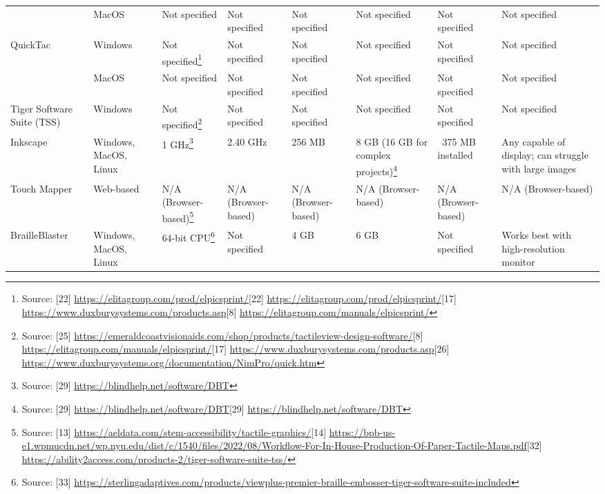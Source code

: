 \begin{longtable}{|l|l|l|l|l|l|l|l|}
 & MacOS & Not specified\footnotemark[3] & Not specified\footnotemark[3] & Not specified\footnotemark[3] & Not specified\footnotemark[3] & Not specified\footnotemark[3] & Not specified\footnotemark[3] \\
QuickTac & Windows & Not specified\footnote{Source: [22] \url{https://elitagroup.com/prod/elpicsprint/}[22] \url{https://elitagroup.com/prod/elpicsprint/}[17] \url{https://www.duxburysystems.com/products.asp}[8] \url{https://elitagroup.com/manuals/elpicsprint/}} & Not specified\footnotemark[4] & Not specified\footnotemark[4] & Not specified\footnotemark[4] & Not specified\footnotemark[4] & Not specified\footnotemark[4] \\
 & MacOS & Not specified\footnotemark[4] & Not specified\footnotemark[4] & Not specified\footnotemark[4] & Not specified\footnotemark[4] & Not specified\footnotemark[4] & Not specified\footnotemark[4] \\
Tiger Software Suite (TSS) & Windows & Not specified\footnote{Source: [25] \url{https://emeraldcoastvisionaids.com/shop/products/tactileview-design-software/}[8] \url{https://elitagroup.com/manuals/elpicsprint/}[17] \url{https://www.duxburysystems.com/products.asp}[26] \url{https://www.duxburysystems.org/documentation/NimPro/quick.htm}} & Not specified\footnotemark[5] & Not specified\footnotemark[5] & Not specified\footnotemark[5] & Not specified\footnotemark[5] & Not specified\footnotemark[5] \\
Inkscape & Windows, MacOS, Linux & 1 GHz\footnote{Source: [29] \url{https://blindhelp.net/software/DBT}} & 2.40 GHz\footnotemark[6] & 256 MB\footnotemark[6] & 8 GB (16 GB for complex projects)\footnote{Source: [29] \url{https://blindhelp.net/software/DBT}[29] \url{https://blindhelp.net/software/DBT}} & ~375 MB installed\footnotemark[6] & Any capable of display; can struggle with large images\footnotemark[7] \\
Touch Mapper & Web-based & N/A (Browser-based)\footnote{Source: [13] \url{https://aeldata.com/stem-accessibility/tactile-graphics/}[14] \url{https://bpb-us-e1.wpmucdn.net/wp.nyu.edu/dist/c/1540/files/2022/08/Workflow-For-In-House-Production-Of-Paper-Tactile-Maps.pdf}[32] \url{https://ability2access.com/products-2/tiger-software-suite-tss/}} & N/A (Browser-based)\footnotemark[8] & N/A (Browser-based)\footnotemark[8] & N/A (Browser-based)\footnotemark[8] & N/A (Browser-based)\footnotemark[8] & N/A (Browser-based)\footnotemark[8] \\
BrailleBlaster & Windows, MacOS, Linux & 64-bit CPU\footnote{Source: [33] \url{https://sterlingadaptives.com/products/viewplus-premier-braille-embosser-tiger-software-suite-included}} & Not specified & 4 GB\footnotemark[9] & 6 GB\footnotemark[9] & Not specified & Works best with high-resolution monitor\footnotemark[9] \\
\end{longtable}

